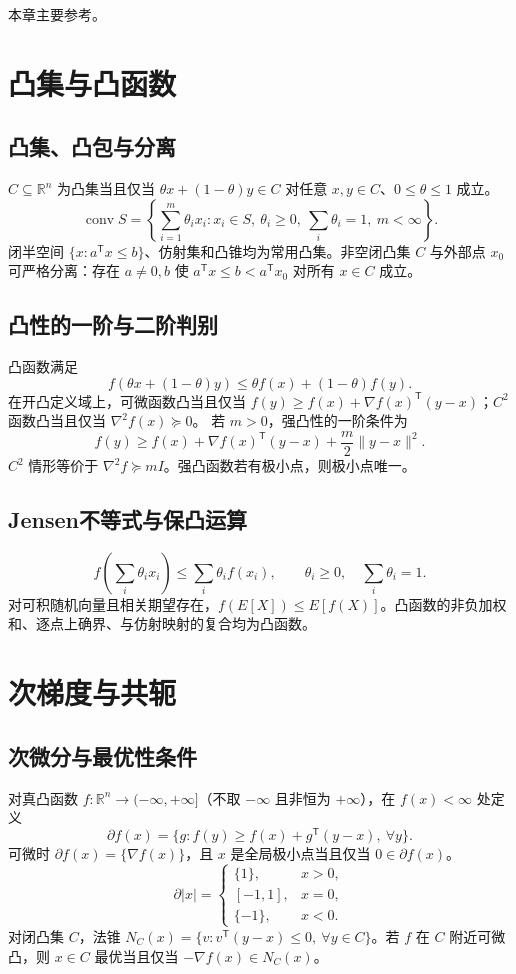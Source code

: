 \documentclass[../main.tex]{subfiles}
\begin{document}
本章主要参考\cite{convex,chambolle}。

\section{凸集与凸函数}
\subsection{凸集、凸包与分离}
$C\subseteq\mathbb R^n$ 为凸集当且仅当 $\theta x+(1-\theta)y\in C$ 对任意 $x,y\in C$、$0\le\theta\le1$ 成立。
\[
\operatorname{conv}S=\left\{\sum_{i=1}^m\theta_ix_i:x_i\in S,\ \theta_i\ge0,\ \sum_i\theta_i=1,\ m<\infty\right\}.
\]
闭半空间 $\{x:a^{\mathsf T}x\le b\}$、仿射集和凸锥均为常用凸集。非空闭凸集 $C$ 与外部点 $x_0$ 可严格分离：存在 $a\ne0,b$ 使 $a^{\mathsf T}x\le b<a^{\mathsf T}x_0$ 对所有 $x\in C$ 成立。
\subsection{凸性的一阶与二阶判别}
凸函数满足
\[
f(\theta x+(1-\theta)y)\le\theta f(x)+(1-\theta)f(y).
\]
在开凸定义域上，可微函数凸当且仅当 $f(y)\ge f(x)+\nabla f(x)^{\mathsf T}(y-x)$；$C^2$ 函数凸当且仅当 $\nabla^2f(x)\succeq0$。
若 $m>0$，强凸性的一阶条件为
\[
f(y)\ge f(x)+\nabla f(x)^{\mathsf T}(y-x)+\frac m2\|y-x\|^2.
\]
$C^2$ 情形等价于 $\nabla^2f\succeq mI$。强凸函数若有极小点，则极小点唯一。
\subsection{Jensen不等式与保凸运算}
\[
f\!\left(\sum_i\theta_ix_i\right)\le\sum_i\theta_if(x_i),\qquad
\theta_i\ge0,\quad\sum_i\theta_i=1.
\]
对可积随机向量且相关期望存在，$f(E[X])\le E[f(X)]$。凸函数的非负加权和、逐点上确界、与仿射映射的复合均为凸函数。
\section{次梯度与共轭}
\subsection{次微分与最优性条件}
对真凸函数 $f:\mathbb R^n\to(-\infty,+\infty]$（不取 $-\infty$ 且非恒为 $+\infty$），在 $f(x)<\infty$ 处定义
\[
\partial f(x)=\{g:f(y)\ge f(x)+g^{\mathsf T}(y-x),\ \forall y\}.
\]
可微时 $\partial f(x)=\{\nabla f(x)\}$，且 $x$ 是全局极小点当且仅当 $0\in\partial f(x)$。
\[
\partial|x|=\begin{cases}\{1\},&x>0,\\{[-1,1]},&x=0,\\\{-1\},&x<0.\end{cases}
\]
对闭凸集 $C$，法锥 $N_C(x)=\{v:v^{\mathsf T}(y-x)\le0,\ \forall y\in C\}$。若 $f$ 在 $C$ 附近可微凸，则 $x\in C$ 最优当且仅当 $-\nabla f(x)\in N_C(x)$。
\end{document}
